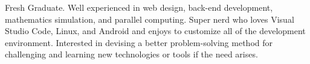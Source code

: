 \begin{cvletter}

Fresh Graduate. Well experienced in web design, back-end development, mathematics simulation, and parallel computing. Super nerd who loves Visual Studio Code, Linux, and Android and enjoys to customize all of the development environment. Interested in devising a better problem-solving method for challenging and learning new technologies or tools if the need arises.

\end{cvletter}